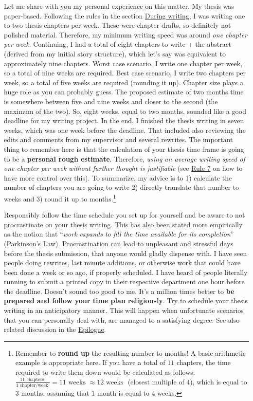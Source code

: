 \documentclass[
  12pt,
  oneside]{book}
\begin{document}
Let me share with you my personal experience on this matter.
My thesis was paper-based.
Following the rules in the section \protect\hyperlink{during}{During writing}, I was writing one to two thesis chapters per week.
These were chapter drafts, so definitely not polished material.
Therefore, my minimum writing speed was around \emph{one chapter per week}.
Continuing, I had a total of eight chapters to write + the abstract (derived from my initial story structure), which let's say was equivalent to approximately nine chapters.
Worst case scenario, I write one chapter per week, so a total of nine weeks are required.
Best case scenario, I write two chapters per week, so a total of five weeks are required (rounding it up).
Chapter size plays a huge role as you can probably guess.
The proposed estimate of two months time is somewhere between five and nine weeks and closer to the second (the maximum of the two).
So, eight weeks, equal to two months, sounded like a good deadline for my writing project.
In the end, I finished the thesis writing in seven weeks, which was one week before the deadline.
That included also reviewing the edits and comments from my supervisor and several rewrites.
The important thing to remember here is that the calculation of your thesis time frame is going to be a \textbf{personal rough estimate}.
Therefore, \emph{using an average writing speed of one chapter per week without further thought is justifiable} (see \protect\hyperlink{rule7}{Rule 7} on how to have more control over this).
To summarize, my advice is to 1) calculate the number of chapters you are going to write 2) directly translate that number to weeks and 3) round it up to months.\footnote{Remember to \textbf{round up} the resulting number to months! A basic arithmetic example is appropriate here. If you have a total of \(11\) chapters, the time required to write them down would be calculated as follows: \(\frac{11 \text{ chapters }}{1 \text{ chapter/week }}=11 \text{ weeks } \approx 12 \text{ weeks }\) (closest multiple of \(4\)), which is equal to \(3\) months, assuming that \(1\) month is equal to \(4\) weeks.}

Responsibly follow the time schedule you set up for yourself and be aware to not procrastinate on your thesis writing.
This has also been stated more empirically as the notion that ``\emph{work expands to fill the time available for its completion}'' (Parkinson's Law).
Procrastination can lead to unpleasant and stressful days before the thesis submission, that anyone would gladly dispense with.
I have seen people doing rewrites, last minute additions, or otherwise work that could have been done a week or so ago, if properly scheduled.
I have heard of people literally running to submit a printed copy in their respective department one hour before the deadline.
Doesn't sound too good to me.
It's a million times better to \textbf{be prepared and follow your time plan religiously}.
Try to schedule your thesis writing in an anticipatory manner.
This will happen when unfortunate scenarios that you can personally deal with, are managed to a satisfying degree.
See also related discussion in the \protect\hyperlink{epilogue}{Epilogue}.
\end{document}
